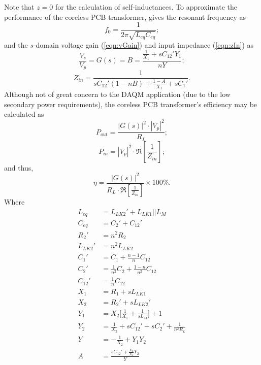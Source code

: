 \documentclass[conference]{IEEEtran}
\begin{document}
\hspace{-15pt}Note that $z = 0$ for the calculation of self-inductances. 
To approximate the performance of the coreless PCB transformer, \cite{TangHuiFundamental} gives the resonant frequency as
%
\begin{equation}
	f_{0} = \frac{1}{2\pi\sqrt{L_{eq}C_{eq}}};
\end{equation}
%
and the $s$-domain voltage gain (\ref{eqn:vGain}) and input impedance (\ref{eqn:zIn}) as
%
\begin{equation}
	\label{eqn:vGain}
	\frac{V_{s}}{V_{p}} = G(s) = B = \frac{\frac{1}{X_{1}}+sC_{12}'Y_{1}}{nY};
\end{equation}
%
\begin{equation}
	\label{eqn:zIn}
	Z_{in} = \frac{1}{sC_{12}'(1-nB)+\frac{1-A}{X_{1}}+sC_{1}'}.
\end{equation}
%
Although not of great concern to the DAQM application (due to the low secondary power requirements), the coreless PCB transformer's efficiency  may be calculated as \cite{TangHuiFundamental}
\begin{equation}
	P_{out} = \frac{|G(s)|^{2}\cdot|V_{p}|^{2}}{R_{L}};
\end{equation}
\begin{equation}
	P_{in} = |V_{p}|^{2}\cdot\Re \left[ \frac{1}{Z_{in}} \right];
\end{equation}
and thus,
\begin{equation}
	\eta = \frac{|G(s)|^{2}}{R_{L}\cdot\Re \left[ \frac{1}{Z_{in}} \right]}\times 100 \%.
\end{equation}
%
Where
\vspace{-5pt}
\begin{align*}
	L_{eq}   &= L_{LK2}'+L_{LK1}||L_{M} 	\\
	C_{eq}   &= C_{2}'+C_{12}'				\\
	R_{2}'   &= n^{2}R_{2}					\\
	L_{LK2}' &= n^{2}L_{LK2}				\\
	C_{1}'   &= C_{1} + \frac{n-1}{n}C_{12}	\\
	C_{2}'   &= \frac{1}{n^{2}}C_{2} + \frac{1-n}{n^{2}}C_{12}	\\
	C_{12}'  &= \frac{1}{n}C_{12}			\\
	X_{1}    &= R_{1}  + sL_{LK1}			\\
	X_{2}    &= R_{2}' + sL_{LK2}'			\\
	Y_{1}    &= X_{2} \lbrack \frac{1}{X_{1}} + \frac{1}{sL_{M}} \rbrack +1	\\
	Y_{2}    &= \frac{1}{X_{2}} + sC_{12}' + sC_{2}' + \frac{1}{n^{2}R_{L}}	\\
	Y        &= -\frac{1}{X_{2}} + Y_{1}Y_{2}	\\
	A        &= \frac{sC_{12}' + \frac{X_{2}}{X_{1}} Y_{2}}{Y}
\end{align*}
%
\end{document}
